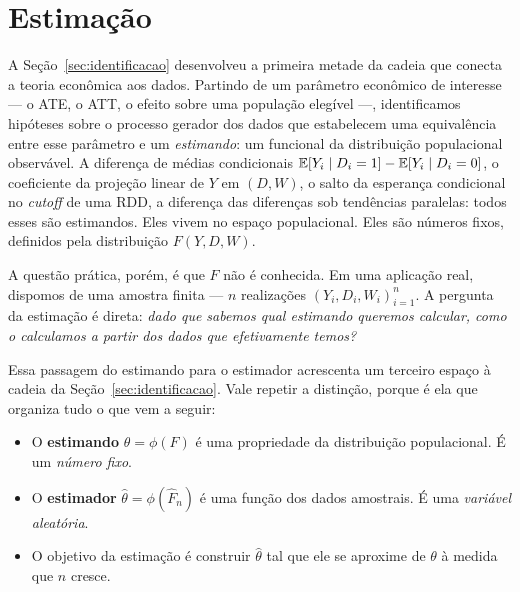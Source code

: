
\chapter{Estimação}
\label{cap:estimacao}
\label{sec:estimacao}

A Seção~\ref{sec:identificacao} desenvolveu a primeira metade da cadeia que conecta a teoria econômica aos dados. Partindo de um parâmetro econômico de interesse --- o ATE, o ATT, o efeito sobre uma população elegível ---, identificamos hipóteses sobre o processo gerador dos dados que estabelecem uma equivalência entre esse parâmetro e um \textit{estimando}: um funcional da distribuição populacional observável. A diferença de médias condicionais $\mathbb{E}[Y_i \mid D_i = 1] - \mathbb{E}[Y_i \mid D_i = 0]$, o coeficiente da projeção linear de $Y$ em $(D, W)$, o salto da esperança condicional no \textit{cutoff} de uma RDD, a diferença das diferenças sob tendências paralelas: todos esses são estimandos. Eles vivem no espaço populacional. Eles são números fixos, definidos pela distribuição $F(Y, D, W)$.

A questão prática, porém, é que $F$ não é conhecida. Em uma aplicação real, dispomos de uma amostra finita --- $n$ realizações $(Y_i, D_i, W_i)_{i=1}^n$. A pergunta da estimação é direta: \textit{dado que sabemos qual estimando queremos calcular, como o calculamos a partir dos dados que efetivamente temos?}

Essa passagem do estimando para o estimador acrescenta um terceiro espaço à cadeia da Seção~\ref{sec:identificacao}. Vale repetir a distinção, porque é ela que organiza tudo o que vem a seguir:

\begin{itemize}
  \item O \textbf{estimando} $\theta = \phi(F)$ é uma propriedade da distribuição populacional. É um \textit{número fixo}.
  \item O \textbf{estimador} $\hat{\theta} = \phi(\hat{F}_n)$ é uma função dos dados amostrais. É uma \textit{variável aleatória}.
  \item O objetivo da estimação é construir $\hat{\theta}$ tal que ele se aproxime de $\theta$ à medida que $n$ cresce.
\end{itemize}

